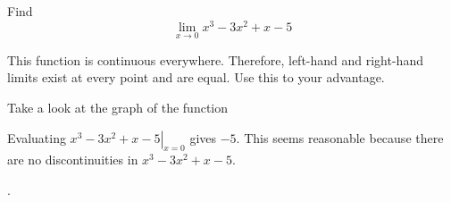 \documentclass{ximera}
\begin{document}
\begin{question}
  Find 
  \[
  \displaystyle \lim_{x\to 0} x^3-3x^2+x-5
  \]
  \begin{solution}
    \begin{hint}
      This function is continuous everywhere. Therefore, left-hand and right-hand limits exist at every point and are equal. Use this to your advantage.
    \end{hint}
     \begin{hint}
    Take a look at the graph of the function
    \begin{center}
      \end{center}
    \end{hint}
    \begin{hint}
     Evaluating $\left.x^3-3x^2+x-5\right|_{x=0}$ gives $-5$. This seems reasonable because there are no discontinuities in $x^3-3x^2+x-5$.
    \end{hint}
    .
  \end{solution}
\end{question}
\end{document}
